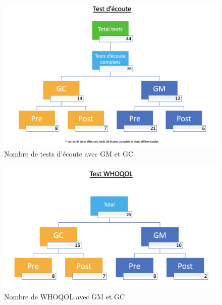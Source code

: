 \begin{figure}
	\centering
	\includegraphics[width=1\linewidth]{images/graphiques/Testecoute.png}
	\caption{Nombre de tests d'écoute avec GM et GC}
	
\end{figure}



\begin{figure}
	\centering
	\includegraphics[width=1\linewidth]{images/graphiques/TestWQ.png}
	\caption{Nombre de WHOQOL avec GM et GC}
\end{figure}






    
     
